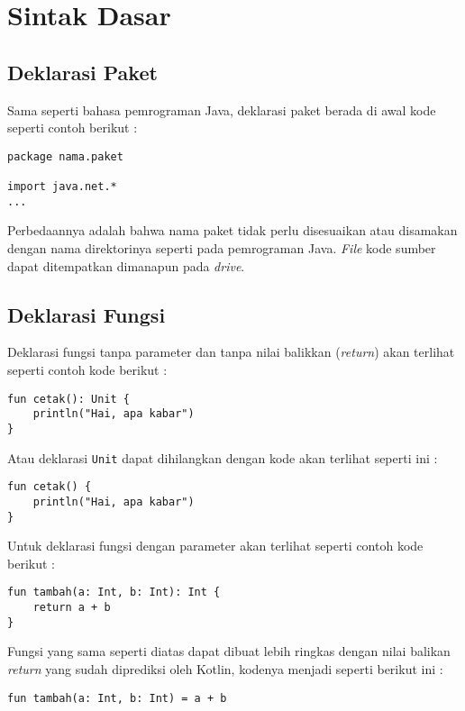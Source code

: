 \section{Sintak Dasar}

\subsection{Deklarasi Paket}

Sama seperti bahasa pemrograman Java, deklarasi paket berada di awal kode seperti contoh berikut :

\begin{lstlisting}
package nama.paket

import java.net.*
...
\end{lstlisting}

Perbedaannya adalah bahwa nama paket tidak perlu disesuaikan atau disamakan dengan nama direktorinya seperti pada pemrograman Java. \textit{File} kode sumber dapat ditempatkan dimanapun pada \textit{drive}.

\subsection{Deklarasi Fungsi}

Deklarasi fungsi tanpa parameter dan tanpa nilai balikkan (\textit{return}) akan terlihat seperti contoh kode berikut :

\begin{lstlisting}
fun cetak(): Unit {
	println("Hai, apa kabar")
}
\end{lstlisting}

Atau deklarasi \texttt{Unit} dapat dihilangkan dengan kode akan terlihat seperti ini :

\begin{lstlisting}
fun cetak() {
	println("Hai, apa kabar")
}
\end{lstlisting}

Untuk deklarasi fungsi dengan parameter akan terlihat seperti contoh kode berikut :

\begin{lstlisting}
fun tambah(a: Int, b: Int): Int {
	return a + b
}
\end{lstlisting}

Fungsi yang sama seperti diatas dapat dibuat lebih ringkas dengan nilai balikan \textit{return} yang sudah diprediksi oleh Kotlin, kodenya menjadi seperti berikut ini :

\begin{lstlisting}
fun tambah(a: Int, b: Int) = a + b
\end{lstlisting}

